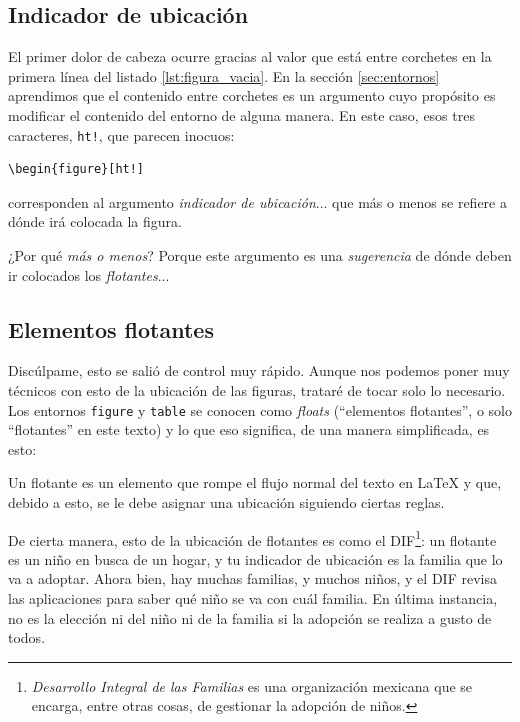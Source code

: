 \subsection{Indicador de ubicación}
\label{sub:indicador_de_ubicacion}



El primer dolor de cabeza ocurre gracias al valor que está entre corchetes en la primera línea del listado \ref{lst:figura_vacia}. En la sección \ref{sec:entornos} aprendimos que el contenido entre corchetes es un argumento cuyo propósito es modificar el contenido del entorno de alguna manera. En este caso, esos tres caracteres, \texttt{ht!}, que parecen inocuos:

\begin{lstlisting}[style=latex,numbers=none]
\begin{figure}[ht!]
\end{lstlisting}

\noindent corresponden al argumento \emph{indicador de ubicación}... que más o menos se refiere a dónde irá colocada la figura.

¿Por qué \emph{más o menos}? Porque este argumento es una \emph{sugerencia} de dónde deben ir colocados los \emph{flotantes}...



\subsection{Elementos flotantes}
\label{sub:elementos_flotantes}



Discúlpame, esto se salió de control muy rápido. Aunque nos podemos poner muy técnicos con esto de la ubicación de las figuras, trataré de tocar solo lo necesario. Los entornos \texttt{figure} y \texttt{table} se conocen como \emph{floats} (``elementos flotantes'', o solo ``flotantes'' en este texto) y lo que eso significa, de una manera simplificada, es esto:

\begin{displayquote}
Un flotante es un elemento que rompe el flujo normal del texto en \LaTeX{} y que, debido a esto, se le debe asignar una ubicación siguiendo ciertas reglas.
\end{displayquote}

De cierta manera, esto de la ubicación de flotantes es como el DIF\footnote{\emph{Desarrollo Integral de las Familias} es una organización mexicana que se encarga, entre otras cosas, de gestionar la adopción de niños.}: un flotante es un niño en busca de un hogar, y tu indicador de ubicación es la familia que lo va a adoptar. Ahora bien, hay muchas familias, y muchos niños, y el DIF revisa las aplicaciones para saber qué niño se va con cuál familia. En última instancia, no es la elección ni del niño ni de la familia si la adopción se realiza a gusto de todos.

